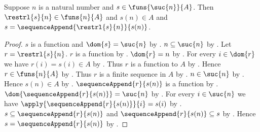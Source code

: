 \begin{proposition}\label{finite_sequence_split_last}
    Suppose $n$ is a natural number and $s\in\funs{\suc{n}}{A}$.
    Then $\restrl{s}{n}\in\funs{n}{A}$ and $s(n)\in A$ and
        $s=\sequenceAppend{\restrl{s}{n}}{s(n)}$.
\end{proposition}
\begin{proof}
    $s$ is a function and $\dom{s}=\suc{n}$ by .
    $n\subseteq\suc{n}$ by .
    Let $r=\restrl{s}{n}$.
    $r$ is a function by .
    $\dom{r}=n$ by
        .
    For every $i\in\dom{r}$ we have $r(i)=s(i)\in A$
        by .
    Thus $r$ is a function to $A$ by \auto.
    Hence $r\in\funs{n}{A}$ by .
    Thus $r$ is a finite sequence in $A$ by .
    $n\in\suc{n}$ by .
    Hence $s(n)\in A$ by .
    $\sequenceAppend{r}{s(n)}$ is a function
        by .
    $\dom{\sequenceAppend{r}{s(n)}}=\suc{n}$
        by .
    For every $i\in\suc{n}$ we have
        $\apply{\sequenceAppend{r}{s(n)}}{i}=s(i)$
        by .
    $s\subseteq\sequenceAppend{r}{s(n)}$ and
        $\sequenceAppend{r}{s(n)}\subseteq s$
        by .
    Hence $s=\sequenceAppend{r}{s(n)}$
        by .
\end{proof}

